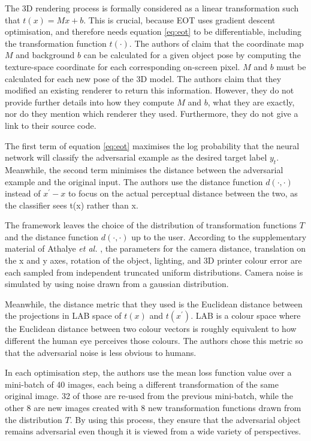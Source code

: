 The 3D rendering process is formally considered as a linear transformation such that $t(x) = Mx + b$. This is crucial, because EOT uses gradient descent optimisation, and therefore needs equation \ref{eq:eot} to be differentiable, including the transformation function $t(\cdot)$. The authors of \cite{athalye} claim that the coordinate map $M$ and background $b$ can be calculated for a given object pose by computing the texture-space coordinate for each corresponding on-screen pixel. $M$ and $b$ must be calculated for each new pose of the 3D model. The authors claim that they modified an existing renderer to return this information. However, they do not provide further details into how they compute $M$ and $b$, what they are exactly, nor do they mention which renderer they used. Furthermore, they do not give a link to their source code.

The first term of equation \ref{eq:eot} maximises the log probability that the neural network will classify the adversarial example as the desired target label $y_{t}$. Meanwhile, the second term minimises the distance between the adversarial example and the original input. The authors use the distance function $d(\cdot, \cdot)$ instead of $x^\prime - x$ to focus on the actual perceptual distance between the two, as the classifier sees t(x) rather than x.

The framework leaves the choice of the distribution of transformation functions $T$ and the distance function $d(\cdot, \cdot)$ up to the user. According to the supplementary material of Athalye \textit{et al.} \cite{athalye}, the parameters for the camera distance, translation on the x and y axes, rotation of the object, lighting, and 3D printer colour error are each sampled from independent truncated uniform distributions. Camera noise is simulated by using noise drawn from a gaussian distribution.

Meanwhile, the distance metric that they used is the Euclidean distance between the projections in LAB space of $t(x)$ and $t(x^\prime)$. LAB \cite{lab} is a colour space where the Euclidean distance between two colour vectors is roughly equivalent to how different the human eye perceives those colours. The authors chose this metric so that the adversarial noise is less obvious to humans. 

In each optimisation step, the authors use the mean loss function value over a mini-batch of 40 images, each being a different transformation of the same original image. 32 of those are re-used from the previous mini-batch, while the other 8 are new images created with 8 new transformation functions drawn from the distribution $T$. By using this process, they ensure that the adversarial object remains adversarial even though it is viewed from a wide variety of perspectives.

